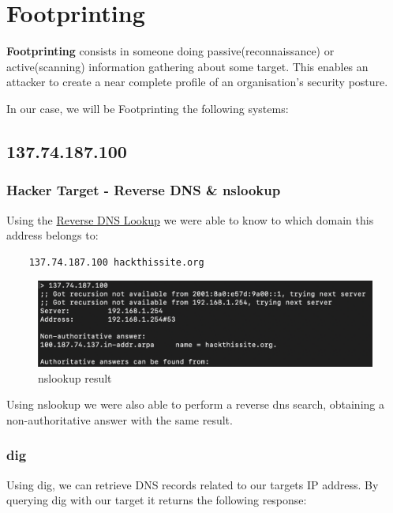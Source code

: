 \section{Footprinting}

\textbf{Footprinting} consists in someone doing passive(reconnaissance) or active(scanning) information gathering about some target. This enables an attacker to create a near complete profile of an organisation’s security posture. 

In our case, we will be Footprinting the following systems:

\subsection{137.74.187.100}

\subsubsection{Hacker Target - Reverse DNS \& nslookup}

Using the \href{https://hackertarget.com/reverse-dns-lookup/}{Reverse DNS Lookup} we were able to know to which domain this address belongs to: 

\begin{lstlisting}
    137.74.187.100 hackthissite.org
\end{lstlisting}

\begin{figure}[ht!]
 	\centering
 	\includegraphics[width=1\linewidth]{img/nsl1.png}
 	\caption{nslookup result}
 \end{figure}

Using nslookup we were also able to perform a reverse dns search, obtaining a non-authoritative answer with the same result.

\subsubsection{dig}

Using dig, we can retrieve DNS records related to our targets IP address. By querying dig with our target it returns the following response:

